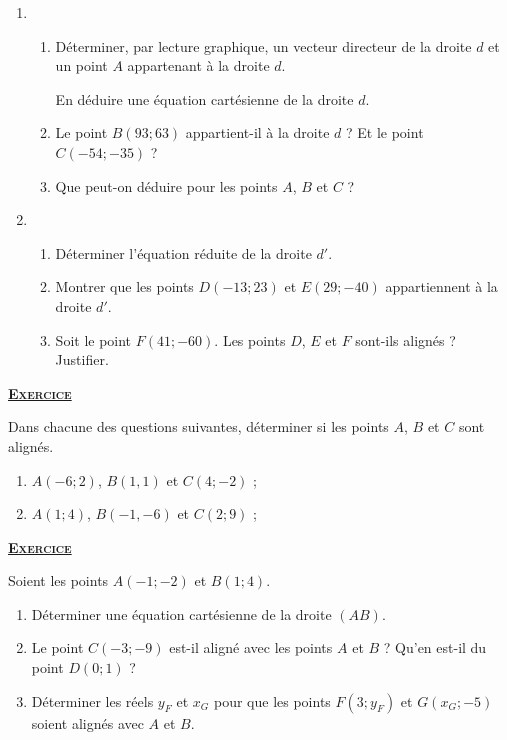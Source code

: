 \documentclass[12pt,a4paper]{article}
\newcounter{nexo}
\newcommand{\exo}{%
\stepcounter{nexo}
{\textbf{\underline{\textsc{Exercice \arabic{nexo}}}}%
\medskip%
}
}
\begin{document}
\begin{enumerate}
\item 
\begin{enumerate}
\item Déterminer, par lecture graphique, un vecteur directeur de la droite $d$ et un point $A$ appartenant à la droite $d$. \par 
En déduire une équation cartésienne de la droite $d$.

\item Le point $B(93 ; 63)$ appartient-il à la droite $d$ ? Et le point $C(-54 ; -35)$ ?
\item Que peut-on déduire pour les points $A$, $B$ et $C$ ?
\end{enumerate}

\item 
\begin{enumerate}
\item Déterminer l'équation réduite de la droite $d'$. 
\item Montrer que les points $D(-13;23)$ et $E(29 ; -40)$ appartiennent à la droite $d'$.
\item Soit le point $F(41 ; -60)$. Les points $D$, $E$ et $F$ sont-ils alignés ? Justifier.
\end{enumerate}
\end{enumerate}

\bigskip

\exo 

Dans chacune des questions suivantes, déterminer si les points $A$, $B$ et $C$ sont alignés. 

{\renewcommand{\theenumi}{\alph{enumi}}
\begin{enumerate}
\item $A(-6 ; 2)$, $B(1,1)$ et $C(4;-2)$ ;
\item $A(1 ; 4)$, $B(-1,-6)$ et $C(2;9)$ ;
\end{enumerate}}

\bigskip

\exo

Soient les points $A(-1;-2)$ et $B(1;4)$. 

\begin{enumerate}
\item Déterminer une équation cartésienne de la droite $(AB)$.
\item Le point $C(-3;-9)$ est-il aligné avec les points $A$ et $B$ ? Qu'en est-il du point $D(0;1)$ ?
\item Déterminer les réels $y_F$ et $x_G$ pour que les points $F(3;y_F)$ et $G(x_G ; -5)$ soient alignés avec $A$ et $B$.
\end{enumerate}

\bigskip
\end{document}
